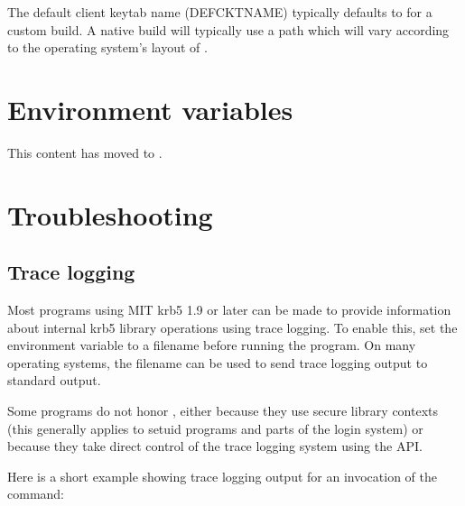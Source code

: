 \documentclass[letterpaper,10pt,english]{sphinxmanual}
\begin{document}
\sphinxAtStartPar
The default client keytab name (DEFCKTNAME) typically defaults to
 for a custom
build.  A native build will typically use a path which will vary
according to the operating system’s layout of .

\sphinxstepscope


\chapter{Environment variables}
\label{\detokenize{admin/env_variables:environment-variables}}\label{\detokenize{admin/env_variables::doc}}
\sphinxAtStartPar
This content has moved to .

\sphinxstepscope


\chapter{Troubleshooting}
\label{\detokenize{admin/troubleshoot:troubleshooting}}\label{\detokenize{admin/troubleshoot:troubleshoot}}\label{\detokenize{admin/troubleshoot::doc}}

\section{Trace logging}
\label{\detokenize{admin/troubleshoot:trace-logging}}\label{\detokenize{admin/troubleshoot:id1}}
\sphinxAtStartPar
Most programs using MIT krb5 1.9 or later can be made to provide
information about internal krb5 library operations using trace
logging.  To enable this, set the  environment variable
to a filename before running the program.  On many operating systems,
the filename  can be used to send trace logging output
to standard output.

\sphinxAtStartPar
Some programs do not honor , either because they use
secure library contexts (this generally applies to setuid programs and
parts of the login system) or because they take direct control of the
trace logging system using the API.

\sphinxAtStartPar
Here is a short example showing trace logging output for an invocation
of the  command:
\end{document}
